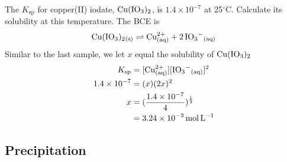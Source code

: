 \begin{sample}{The $K_\mathrm{sp}$ for copper(II) iodate, $\ch{Cu(IO3)2}$, is $1.4\times10^{-7}$
    at 25$^{\circ}$C. Calculate its solubility at this temperature.}
    The BCE is 
    \[
        \ch{Cu(IO3)2_{(s)}}\rightleftharpoons \ch{Cu^{2+}_{(aq)}}+\ch{2IO3^-_{(aq)}}
    \]
    Similar to the last sample, we let $x$ equal the solubility of $\ch{Cu(IO3)2}$
    \begin{align*}
        K_\mathrm{sp}&=[\ch{Cu^{2+}_{(aq)}}][\ch{IO3^-_{(aq)}}]^2\\
        1.4\times10^{-7}&=(x)(2x)^2\\
        x&=(\frac{1.4\times10^{-7}}{4})^\frac{1}{3}\\
         &=3.24\times10^{-3}\,\si{mol.L^{-1}}
    \end{align*}
\end{sample}

\subsection{Precipitation}
